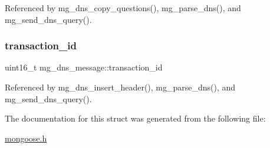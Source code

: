 Referenced by mg\+\_\+dns\+\_\+copy\+\_\+questions(), mg\+\_\+parse\+\_\+dns(), and mg\+\_\+send\+\_\+dns\+\_\+query().

\mbox{\label{structmg__dns__message_afb4a01337779347f74a214c7a273ebcb_afb4a01337779347f74a214c7a273ebcb}} 
\subsubsection{\texorpdfstring{transaction\+\_\+id}{transaction\_id}}
{\footnotesize\ttfamily uint16\+\_\+t mg\+\_\+dns\+\_\+message\+::transaction\+\_\+id}



Referenced by mg\+\_\+dns\+\_\+insert\+\_\+header(), mg\+\_\+parse\+\_\+dns(), and mg\+\_\+send\+\_\+dns\+\_\+query().



The documentation for this struct was generated from the following file\+:\begin{DoxyCompactItemize}
\item 
\hyperlink{mongoose_8h}{mongoose.\+h}\end{DoxyCompactItemize}
